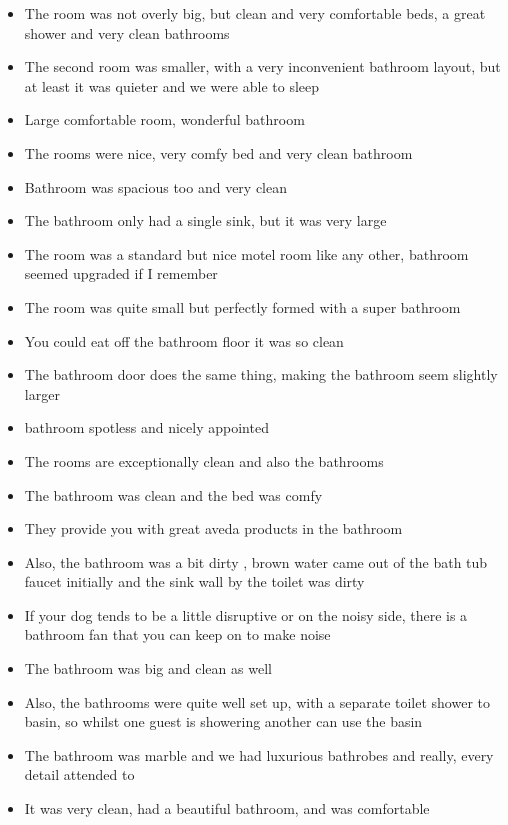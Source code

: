 \begin{table}
\caption{Twenty user reviews of bathrooms in a major chain of hotels.  The data is part of the Opinosis Opinion\slash Review \cite[]{Ganesan2010} in the \textsc{uci} Machine Learning Repository \cite[]{Dua2019} [\protect\url{https://archive.ics.uci.edu/ml/datasets/Opinosis+Opinion+\%26frasl\%3B+Review}].
}
\label{tbl:lsibath}
\begin{itemize}
\item The room was not overly big, but clean and very comfortable beds, a great shower and very clean bathrooms
\item The second room was smaller, with a very inconvenient bathroom layout, but at least it was quieter and we were able to sleep
\item Large comfortable room, wonderful bathroom
\item The rooms were nice, very comfy bed and very clean bathroom
\item Bathroom was spacious too and very clean
\item The bathroom only had a single sink, but it was very large
\item The room was a standard but nice motel room like any other, bathroom seemed upgraded if I remember
\item The room was quite small but perfectly formed with a super bathroom
\item You could eat off the bathroom floor it was so clean
\item The bathroom door does the same thing, making the bathroom seem slightly larger
\item bathroom spotless and nicely appointed
\item The rooms are exceptionally clean and also the bathrooms
\item The bathroom was clean and the bed was comfy
\item They provide you with great aveda products in the bathroom
\item Also, the bathroom was a bit dirty ,  brown water came out of the bath tub faucet initially and the sink wall by the toilet was dirty
\item If your dog tends to be a little disruptive or on the noisy side, there is a bathroom fan that you can keep on to make noise
\item The bathroom was big and clean as well
\item Also, the bathrooms were quite well set up, with a separate toilet shower to basin, so whilst one guest is showering another can use the basin
\item The bathroom was marble and we had luxurious bathrobes and really, every detail attended to
\item It was very clean, had a beautiful bathroom, and was comfortable
\end{itemize}
\end{table}

